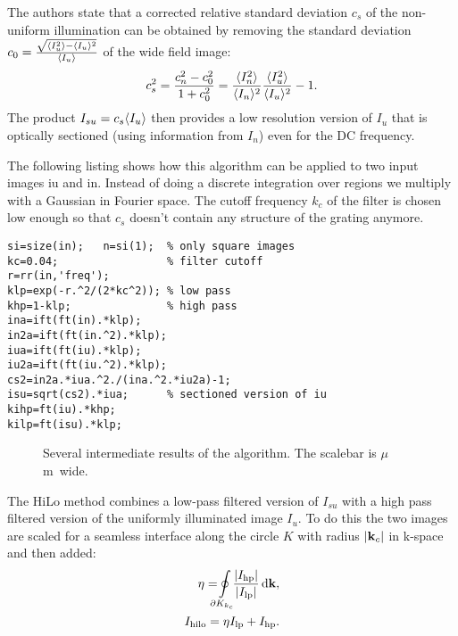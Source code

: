 The authors state that a corrected relative standard deviation $c_s$
of the non-uniform illumination can be obtained by removing the
standard deviation
$c_0=\frac{\sqrt{\langle I_u^2 \rangle-\langle I_u \rangle^2}}{\langle I_u \rangle}$ of the
wide field image:
\begin{align} 
  c_s^2=\frac{c_n^2-c_0^2}{1+c_0^2}
  =
  \frac{\langle I_n^2 \rangle}{\langle I_n \rangle^2}
  \frac{\langle I_u^2 \rangle}{\langle I_u \rangle^2}-1.
\end{align}
The product $I_{su}=c_s\langle I_u \rangle$ then provides a low resolution
version of $I_u$ that is optically sectioned (using information from
$I_n$) even for the DC frequency.

The following listing shows how this algorithm can be applied to two
input images {\sf iu} and {\sf in}. Instead of doing a discrete
integration over regions we multiply with a Gaussian in Fourier
space. The cutoff frequency $k_c$ of the filter is chosen low enough
so that $c_s$ doesn't contain any structure of the grating anymore.
\begin{lstlisting}
si=size(in);   n=si(1);  % only square images
kc=0.04;                 % filter cutoff
r=rr(in,'freq');
klp=exp(-r.^2/(2*kc^2)); % low pass
khp=1-klp;               % high pass
ina=ift(ft(in).*klp);
in2a=ift(ft(in.^2).*klp);
iua=ift(ft(iu).*klp);
iu2a=ift(ft(iu.^2).*klp);
cs2=in2a.*iua.^2./(ina.^2.*iu2a)-1;
isu=sqrt(cs2).*iua;      % sectioned version of iu
kihp=ft(iu).*khp;
kilp=ft(isu).*klp;
\end{lstlisting}
\begin{figure}[htb]
  \centering
  \caption{Several intermediate results of the algorithm. The scalebar is
    \unit[2]{$\mu$m} wide.}
  \label{fig:hilo1interm}
\end{figure}
The HiLo method combines a low-pass filtered version of $I_{su}$ with
a high pass filtered version of the uniformly illuminated image $I_u$.
To do this the two images are scaled for a seamless interface along
the circle $K$ with radius $\mathopen| \mathbf{k}_c \mathclose|$ in k-space and then added:
\begin{align}
  \eta=\!\!\!\!\ointop_{\partial K_{k_c}}\!\!\!
  \frac{\abs{I_\textrm{hp}}}{\abs{I_\textrm{lp}}}\,\textrm{d}\vect k,\\
  I_\textrm{hilo}=\eta I_\textrm{lp}+I_\textrm{hp}.
\end{align}

